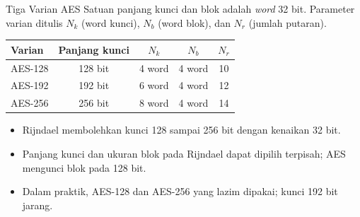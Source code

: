 \documentclass[aspectratio=169,11pt]{beamer}
\begin{document}
\begin{frame}{Tiga Varian AES}
    \footnotesize
    Satuan panjang kunci dan blok adalah \textit{word} 32 bit. Parameter
    varian ditulis $N_k$ (word kunci), $N_b$ (word blok), dan $N_r$
    (jumlah putaran).
    \vspace{0.1cm}
    \begin{center}
    \begin{tabular}{@{}l c c c c@{}}
        \toprule
        \textbf{Varian} & \textbf{Panjang kunci} & $N_k$ & $N_b$ & $N_r$ \\
        \midrule
        AES-128 & 128 bit & 4 word & 4 word & 10 \\
        AES-192 & 192 bit & 6 word & 4 word & 12 \\
        AES-256 & 256 bit & 8 word & 4 word & 14 \\
        \bottomrule
    \end{tabular}
    \end{center}
    \vspace{0.1cm}
    \begin{itemize}
        \item Rijndael membolehkan kunci 128 sampai 256 bit dengan
              kenaikan 32 bit.
        \item Panjang kunci dan ukuran blok pada Rijndael dapat dipilih
              terpisah; AES mengunci blok pada 128 bit.
        \item Dalam praktik, AES-128 dan AES-256 yang lazim dipakai;
              kunci 192 bit jarang.
    \end{itemize}
\end{frame}
\end{document}

